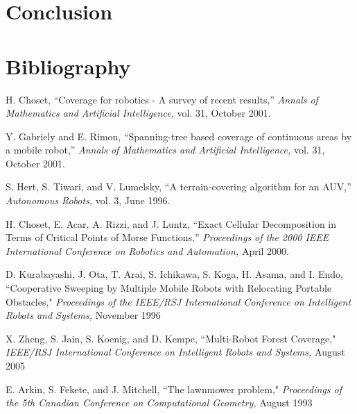 \documentclass[letterpaper, 12pt, leqno]{report}
\begin{document}
\chapter{Conclusion}

\chapter{Bibliography}


\noindent [1] H. Choset, ``Coverage for robotics - A survey of recent results,'' \textit{Annals of \mbox{Mathematics} and Artificial Intelligence,} vol. 31, October 2001.

\noindent [2] Y. Gabriely and E. Rimon, ``Spanning-tree based coverage of continuous areas by a mobile robot,'' \textit{Annals of \mbox{Mathematics} and Artificial Intelligence,} vol. 31, October 2001.

\noindent [3] S. Hert, S. Tiwari, and V. Lumelsky, ``A terrain-covering algorithm for an AUV,'' \textit{Autonomous Robots,} vol. 3, June 1996.

\noindent [4] H. Choset, E. Acar, A. Rizzi, and J. Luntz, ``Exact Cellular Decomposition in Terms of Critical Points of Morse Functions,'' \textit{Proceedings of the 2000 IEEE International Conference on Robotics and Automation,} April 2000.

\noindent [5] D. Kurabayashi, J. Ota, T. Arai, S. Ichikawa, S. Koga, H. Asama, and I. Endo, ``Cooperative Sweeping by Multiple Mobile Robots with Relocating Portable Obstacles," \textit{Proceedings of the IEEE/RSJ International Conference on Intelligent Robots and Systems,} November 1996

\noindent [6] X. Zheng, S. Jain, S. Koenig, and D. Kempe, ``Multi-Robot Forest Coverage," \textit{IEEE/RSJ International Conference on Intelligent Robots and Systems,} August 2005

\noindent [7] E. Arkin, S. Fekete, and J. Mitchell, ``The lawnmower problem," \textit{Proceedings of the 5th Canadian Conference on Computational Geometry,} August 1993
\end{document}
